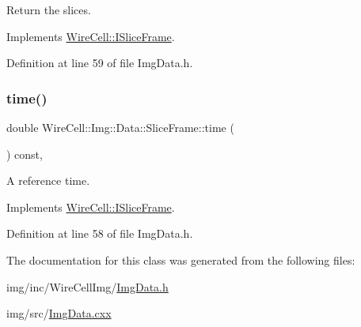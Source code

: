 Return the slices. 



Implements \hyperlink{class_wire_cell_1_1_i_slice_frame_ad3aa9394b6202e3ea4fbd30dbcc1ba2a}{Wire\+Cell\+::\+I\+Slice\+Frame}.



Definition at line 59 of file Img\+Data.\+h.

\mbox{\label{class_wire_cell_1_1_img_1_1_data_1_1_slice_frame_ac93b4f236d7982be45074f9358fe5e0f}} 
\subsubsection{\texorpdfstring{time()}{time()}}
{\footnotesize\ttfamily double Wire\+Cell\+::\+Img\+::\+Data\+::\+Slice\+Frame\+::time (\begin{DoxyParamCaption}{ }\end{DoxyParamCaption}) const\hspace{0.3cm}{\ttfamily [inline]}, {\ttfamily [virtual]}}



A reference time. 



Implements \hyperlink{class_wire_cell_1_1_i_slice_frame_ae0ac97f27ac3783656dd51a31ccbf69b}{Wire\+Cell\+::\+I\+Slice\+Frame}.



Definition at line 58 of file Img\+Data.\+h.



The documentation for this class was generated from the following files\+:\begin{DoxyCompactItemize}
\item 
img/inc/\+Wire\+Cell\+Img/\hyperlink{_img_data_8h}{Img\+Data.\+h}\item 
img/src/\hyperlink{_img_data_8cxx}{Img\+Data.\+cxx}\end{DoxyCompactItemize}
